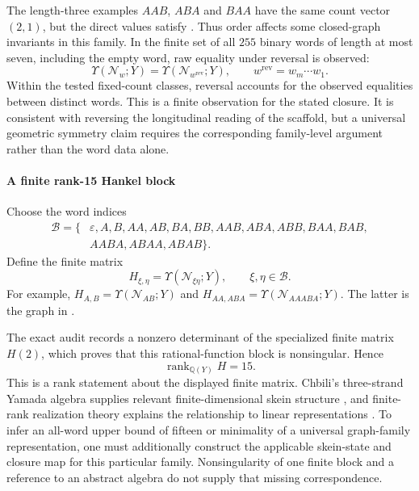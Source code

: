 \documentclass[10pt,twocolumn]{article}
\begin{document}
The length-three examples $AAB$, $ABA$ and $BAA$ have the same count vector $(2,1)$, but the direct values satisfy . Thus order affects some closed-graph invariants in this family. In the finite set of all $255$ binary words of length at most seven, including the empty word, raw equality under reversal is observed:
\begin{equation}
\Upsilon(\mathcal N_w;Y)=\Upsilon(\mathcal N_{w^{\mathrm{rev}}};Y),\qquad w^{\mathrm{rev}}=w_m\cdots w_1.
\label{supp:deriv:eq:observed_reversal}
\end{equation}
Within the tested fixed-count classes, reversal accounts for the observed equalities between distinct words. This is a finite observation for the stated closure. It is consistent with reversing the longitudinal reading of the scaffold, but a universal geometric symmetry claim requires the corresponding family-level argument rather than the word data alone.

\paragraph{A finite rank-15 Hankel block}
\label{supp:transfer_hankel_intuition}
Choose the word indices
\begin{equation}
\begin{aligned}
\mathcal B=\{&\varepsilon,A,B,AA,AB,BA,BB,AAB,ABA,ABB,BAA,BAB,\\
&AABA,ABAA,ABAB\}.
\end{aligned}
\label{supp:deriv:eq:hankel_basis}
\end{equation}
Define the finite matrix
\begin{equation}
H_{\xi,\eta}=\Upsilon(\mathcal N_{\xi\eta};Y),\qquad\xi,\eta\in\mathcal B.
\label{supp:deriv:eq:H_definition}
\end{equation}
For example, $H_{A,B}=\Upsilon(\mathcal N_{AB};Y)$ and $H_{AA,ABA}=\Upsilon(\mathcal N_{AAABA};Y)$. The latter is the graph in .

The exact audit records a nonzero determinant of the specialized finite matrix $H(2)$, which proves that this rational-function block is nonsingular. Hence
\begin{equation}
\boxed{\operatorname{rank}_{\mathbb Q(Y)}H=15.}
\label{supp:deriv:eq:hankel_rank_15}
\end{equation}
This is a rank statement about the displayed finite matrix. Chbili's three-strand Yamada algebra supplies relevant finite-dimensional skein structure \cite{kg_chbili2016}, and finite-rank realization theory explains the relationship to linear representations \cite{kg_carlyle1971realizations,kg_balle2012spectral}. To infer an all-word upper bound of fifteen or minimality of a universal graph-family representation, one must additionally construct the applicable skein-state and closure map for this particular family. Nonsingularity of one finite block and a reference to an abstract algebra do not supply that missing correspondence.
\end{document}
